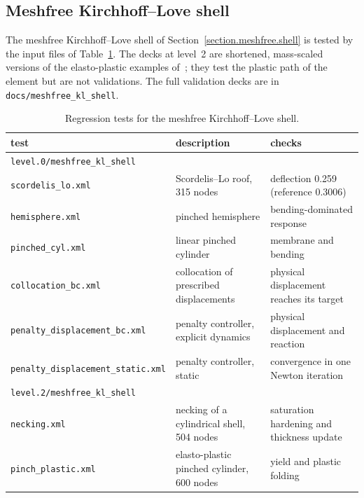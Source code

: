 \subsection{Meshfree Kirchhoff--Love shell}
\label{sect.regression.shell}
The meshfree Kirchhoff--Love shell of Section~\ref{section.meshfree.shell} is tested by the
input files of Table~\ref{tab.regression.shell}. The decks at level~2 are shortened, mass-scaled
versions of the elasto-plastic examples of~\cite{WangBazilevs2025}; they test the plastic path of the
element but are not validations. The full validation decks are in
\texttt{docs/meshfree\_kl\_shell}.
\begin{table}[h]
\caption{\label{tab.regression.shell} Regression tests for the meshfree Kirchhoff--Love shell.}
\begin{center}
{\small
\begin{tabular}[c]{|p{2.35in}|>{\raggedright\arraybackslash}p{1.9in}|>{\raggedright\arraybackslash}p{1.55in}|}
\hline
\textbf{test} & \textbf{description} & \textbf{checks}\\
\hline
\multicolumn{3}{|l|}{\texttt{level.0/meshfree\_kl\_shell}}\\
\hline
\texttt{scordelis\_lo.xml} & Scordelis--Lo roof, 315 nodes & deflection 0.259 (reference 0.3006)\\
\hline
\texttt{hemisphere.xml} & pinched hemisphere & bending-dominated response\\
\hline
\texttt{pinched\_cyl.xml} & linear pinched cylinder & membrane and bending\\
\hline
\texttt{collocation\_bc.xml} & collocation of prescribed displacements & physical displacement reaches its target\\
\hline
\texttt{penalty\_displacement\_bc.xml} & penalty controller, explicit dynamics & physical displacement and reaction\\
\hline
\texttt{penalty\_displacement\_static.xml} & penalty controller, static & convergence in one Newton iteration\\
\hline
\multicolumn{3}{|l|}{\texttt{level.2/meshfree\_kl\_shell}}\\
\hline
\texttt{necking.xml} & necking of a cylindrical shell, 504 nodes & saturation hardening and thickness update\\
\hline
\texttt{pinch\_plastic.xml} & elasto-plastic pinched cylinder, 600 nodes & yield and plastic folding\\
\hline
\end{tabular}}
\end{center}
\end{table}

